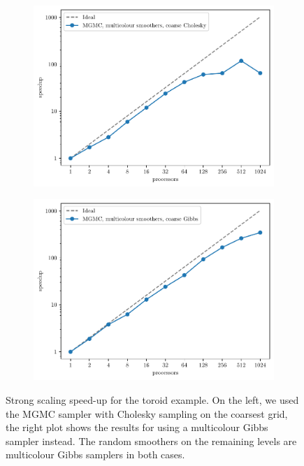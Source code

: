 \documentclass[
fontsize=11pt,
paper=a4,
numbers=noenddot
]{scrartcl}
\begin{document}
\begin{figure}[htbp]
    \centering
    \begin{subfigure}[b]{0.49\textwidth}
        \centering
        \includegraphics[width=\textwidth]{plots/strong_scaling_mgmc+mg+cholesky_toroid.pdf}
    \end{subfigure}
    \hfill
    \begin{subfigure}[b]{0.49\textwidth}
        \centering
        \includegraphics[width=\textwidth]{plots/strong_scaling_mgmc+mg+gibbs_toroid.pdf}
      \end{subfigure}
      \caption{Strong scaling speed-up for the toroid example. On the left, we used the MGMC sampler with Cholesky sampling on the coarsest grid, the right plot shows the results for using a multicolour Gibbs sampler instead. The random smoothers on the remaining levels are multicolour Gibbs samplers in both cases.}
    \label{fig:toroid_ss}
\end{figure}
\end{document}
